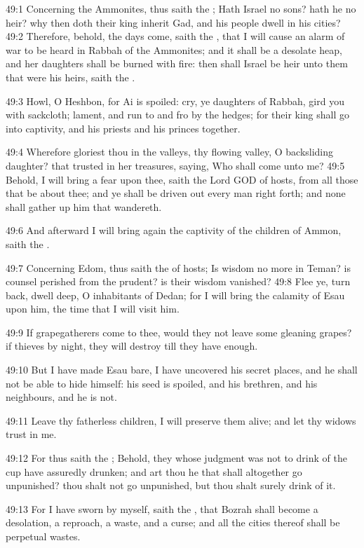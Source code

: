 49:1 Concerning the Ammonites, thus saith the \LORD; Hath Israel no
sons?  hath he no heir? why then doth their king inherit Gad, and his
people dwell in his cities?  49:2 Therefore, behold, the days come,
saith the \LORD, that I will cause an alarm of war to be heard in
Rabbah of the Ammonites; and it shall be a desolate heap, and her
daughters shall be burned with fire: then shall Israel be heir unto
them that were his heirs, saith the \LORD.

49:3 Howl, O Heshbon, for Ai is spoiled: cry, ye daughters of Rabbah,
gird you with sackcloth; lament, and run to and fro by the hedges; for
their king shall go into captivity, and his priests and his princes
together.

49:4 Wherefore gloriest thou in the valleys, thy flowing valley, O
backsliding daughter? that trusted in her treasures, saying, Who shall
come unto me?  49:5 Behold, I will bring a fear upon thee, saith the
Lord GOD of hosts, from all those that be about thee; and ye shall be
driven out every man right forth; and none shall gather up him that
wandereth.

49:6 And afterward I will bring again the captivity of the children of
Ammon, saith the \LORD.

49:7 Concerning Edom, thus saith the \LORD of hosts; Is wisdom no more
in Teman? is counsel perished from the prudent? is their wisdom
vanished?  49:8 Flee ye, turn back, dwell deep, O inhabitants of
Dedan; for I will bring the calamity of Esau upon him, the time that I
will visit him.

49:9 If grapegatherers come to thee, would they not leave some
gleaning grapes? if thieves by night, they will destroy till they have
enough.

49:10 But I have made Esau bare, I have uncovered his secret places,
and he shall not be able to hide himself: his seed is spoiled, and his
brethren, and his neighbours, and he is not.

49:11 Leave thy fatherless children, I will preserve them alive; and
let thy widows trust in me.

49:12 For thus saith the \LORD; Behold, they whose judgment was not to
drink of the cup have assuredly drunken; and art thou he that shall
altogether go unpunished? thou shalt not go unpunished, but thou shalt
surely drink of it.

49:13 For I have sworn by myself, saith the \LORD, that Bozrah shall
become a desolation, a reproach, a waste, and a curse; and all the
cities thereof shall be perpetual wastes.

